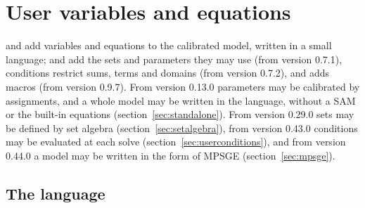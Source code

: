 \chapter{User variables and equations}\label{chap:user}

 and  add variables and equations to
the calibrated model, written in a small language;  and
 add the sets and parameters they may use (from
version 0.7.1), conditions restrict sums, terms and domains (from version
0.7.2), and  adds macros (from version 0.9.7). From version
0.13.0 parameters may be calibrated by assignments, and a whole model may be
written in the language, without a SAM or the built-in equations
(section~\ref{sec:standalone}). From version 0.29.0 sets may be defined by
set algebra (section~\ref{sec:setalgebra}), from version 0.43.0 conditions
may be evaluated at each solve (section~\ref{sec:userconditions}), and from
version 0.44.0 a model may be written in the form of MPSGE
(section~\ref{sec:mpsge}).

\section{The language}

